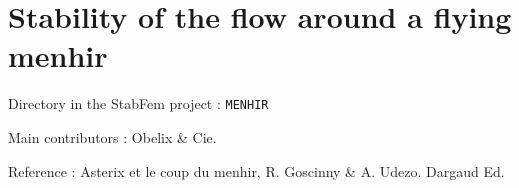 
\chapter{Stability of the flow around a flying menhir}

\begin{description}
\item{Directory in the StabFem project :}  \texttt{MENHIR}
\item{Main contributors :} Obelix \& Cie.
\item{Reference :} Asterix et le coup du menhir, R. Goscinny \& A. Udezo. Dargaud Ed.  
\end{description}